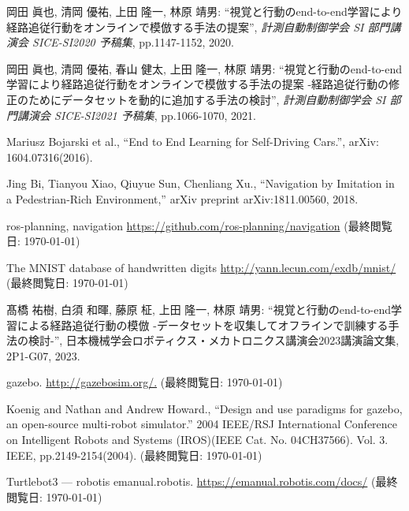 
\begin{thebibliography}{99}

  岡田 眞也, 清岡 優祐, 上田 隆一, 林原 靖男: ``視覚と行動のend-to-end学習により経路追従行動をオンラインで模倣する手法の提案'', \textit{計測自動制御学会 SI 部門講演会 SICE-SI2020 予稿集}, pp.1147-1152, 2020.

  岡田 眞也, 清岡 優祐, 春山 健太, 上田 隆一, 林原 靖男: ``視覚と行動のend-to-end学習により経路追従行動をオンラインで模倣する手法の提案 -経路追従行動の修正のためにデータセットを動的に追加する手法の検討'', \textit{計測自動制御学会 SI 部門講演会 SICE-SI2021 予稿集}, pp.1066-1070, 2021.

  Mariusz Bojarski et al., ``End to End Learning for Self-Driving Cars.'', arXiv: 1604.07316(2016). 

  Jing Bi, Tianyou Xiao, Qiuyue Sun, Chenliang Xu., ``Navigation by Imitation in a Pedestrian-Rich Environment,'' arXiv preprint arXiv:1811.00560, 2018.

  ros-planning, navigation
  \url{https://github.com/ros-planning/navigation}
  (最終閲覧日: \today)

  The MNIST database of handwritten digits
  \url{http://yann.lecun.com/exdb/mnist/}
  (最終閲覧日: \today)

  髙橋 祐樹, 白須 和暉, 藤原 柾, 上田 隆一, 林原 靖男: ``視覚と行動のend-to-end学習による経路追従行動の模倣 -データセットを収集してオフラインで訓練する手法の検討-'', 日本機械学会ロボティクス・メカトロニクス講演会2023講演論文集, 2P1-G07, 2023.

  gazebo.
  \url{http://gazebosim.org/.}
  (最終閲覧日: \today)

  Koenig and Nathan and Andrew Howard., ``Design and use paradigms for gazebo, an open-source multi-robot simulator.'' 2004 IEEE/RSJ International Conference on Intelligent Robots and Systems (IROS)(IEEE Cat. No. 04CH37566). Vol. 3. IEEE, pp.2149-2154(2004).
  (最終閲覧日: \today)

  Turtlebot3 — robotis emanual.robotis.
  \url{https://emanual.robotis.com/docs/}
  (最終閲覧日: \today)

\end{thebibliography}